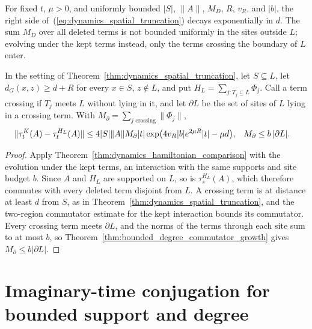 For fixed $t$, $\mu>0$, and uniformly bounded $|S|$, $\|A\|$, $M_D$, $R$,
$v_R$, and $|b|$, the right side of~(\ref{eq:dynamics_spatial_truncation}) decays exponentially in $d$.
The sum $M_D$ over all deleted terms is not bounded uniformly in the sites outside $L$; evolving
under the kept terms instead, only the terms crossing the boundary of $L$ enter.

\begin{theorem}
    \label{thm:dynamics_spatial_truncation_boundary}
    \leanok
    In the setting of Theorem~\ref{thm:dynamics_spatial_truncation}, let $S\subseteq L$,
    let $d_G(x,z)\geq d+R$ for every $x\in S$, $z\notin L$, and put
    $H_L=\sum_{j:T_j\subseteq L}\Phi_j$. Call a term crossing if $T_j$ meets $L$ without
    lying in it, and let $\partial L$ be the set of sites of $L$ lying in a crossing term.
    With $M_\partial=\sum_{j\text{ crossing}}\|\Phi_j\|$,
    \begin{align}
        \|\tau^K_t(A)-\tau^{H_L}_t(A)\|
        &\leq4|S|\|A\|M_\partial|t|
        \exp\bigl(4v_R|b|e^{2\mu R}|t|-\mu d\bigr),
        &
        M_\partial&\leq b\,|\partial L|.
        \notag
    \end{align}
\end{theorem}
\begin{proof}\leanok
    Apply Theorem~\ref{thm:dynamics_hamiltonian_comparison} with the evolution under the
    kept terms, an interaction with the same supports and site budget $b$. Since $A$ and
    $H_L$ are supported on $L$, so is $\tau^{H_L}_s(A)$, which therefore commutes with every
    deleted term disjoint from $L$. A crossing term is at distance at least $d$ from $S$, as in
    Theorem~\ref{thm:dynamics_spatial_truncation}, and the two-region commutator estimate for
    the kept interaction bounds its commutator. Every crossing term meets $\partial L$, and the
    norms of the terms through each site sum to at most $b$, so
    Theorem~\ref{thm:bounded_degree_commutator_growth} gives $M_\partial\leq b|\partial L|$.
\end{proof}

\section{Imaginary-time conjugation for bounded support and degree}
\label{sec:dynamics_imaginary_time}

